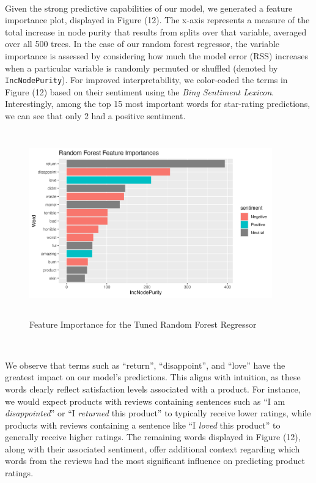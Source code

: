 \documentclass[10pt]{article}
\begin{document}
\

Given the strong predictive capabilities of our model, we generated a feature importance plot, displayed in Figure (12). The x-axis represents a measure of the total increase in node purity that results from splits over that variable, averaged over all 500 trees. In the case of our random forest regressor, the variable importance is assessed by considering how much the model error (RSS) increases when a particular variable is randomly permuted or shuffled (denoted by \texttt{IncNodePurity}). For improved interpretability, we color-coded the terms in Figure (12) based on their sentiment using the \textit{Bing Sentiment Lexicon}. Interestingly, among the top 15 most important words for star-rating predictions, we can see that only 2 had a positive sentiment.

\begin{figure}[ht!]
    \centering
    \hspace*{-2em}
    \includegraphics[height=80mm, width=105mm]{reviews_feat_imp.png}
    \caption{Feature Importance for the Tuned Random Forest Regressor}
\end{figure}


\

We observe that terms such as ``return'', ``disappoint'', and ``love'' have the greatest impact on our model's predictions. This aligns with intuition, as these words clearly reflect satisfaction levels associated with a product. For instance, we would expect products with reviews containing sentences such as ``I am \textit{disappointed}'' or ``I \textit{returned} this product'' to typically receive lower ratings, while products with reviews containing a sentence like ``I \textit{loved} this product'' to generally receive higher ratings. The remaining words displayed in Figure (12), along with their associated sentiment, offer additional context regarding which words from the reviews had the most significant influence on predicting product ratings.
\end{document}
